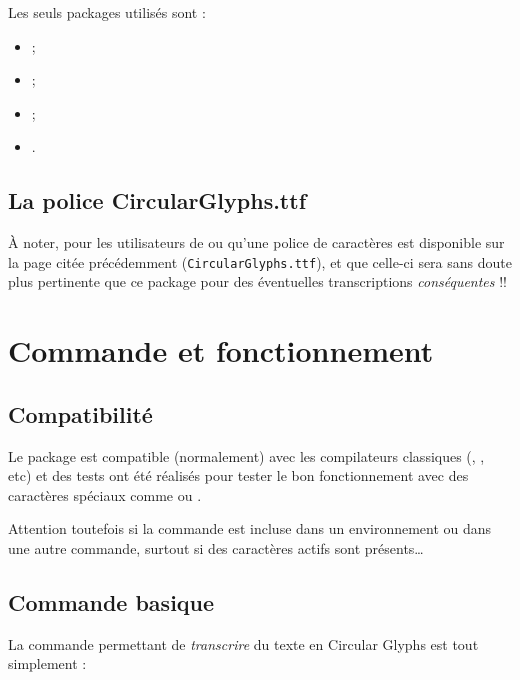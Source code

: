 \documentclass[french,11pt,a4paper]{article}
\begin{document}
Les seuls packages utilisés sont :

\begin{itemize}
	\item {} ;
	\item {} ;
	\item {} ;
	\item {}.
\end{itemize}

\subsection{La police CircularGlyphs.ttf}

À noter, pour les utilisateurs de  ou  qu'une police de caractères est disponible sur la page citée précédemment (\texttt{CircularGlyphs.ttf}), et que celle-ci sera sans doute plus pertinente que ce package pour des éventuelles transcriptions \textit{conséquentes} !!

\pagebreak

\section{Commande et fonctionnement}

\subsection{Compatibilité}

Le package est compatible (normalement) avec les compilateurs classiques (, , etc) et des tests ont été réalisés pour tester le bon fonctionnement avec des caractères spéciaux comme \MontreCode{;} ou \MontreCode{:}.

\smallskip

Attention toutefois si la commande est incluse dans un environnement ou dans une autre commande, surtout si des caractères actifs sont présents\ldots

\subsection{Commande basique}

La commande permettant de \textit{transcrire} du texte en \textsf{Circular Glyphs} est tout simplement :

\begin{DemoCode}[]
\end{DemoCode}
\end{document}

